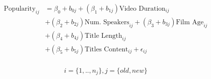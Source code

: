 \begin{align}
\begin{split}
\text{Popularity}_{ij}&=\beta_0+b_{0j}+(\beta_1+b_{1j})\text{Video Duration}_{ij}\\
&+(\beta_2+b_{2j})\text{Num. Speakers}_{ij}+(\beta_3+b_{3j})\text{Film Age}_{ij}\\
&+(\beta_4+b_{4j})\text{Title Length}_{ij}\\
&+(\beta_5+b_{5j})\text{Titles Content}_{ij}+\epsilon_{ij}\\
\end{split}
\label{linear_mixed_times_eqn}
\end{align}

\begin{equation*}
i=\{1,..,n_j\}, j=\{old, new\}
\end{equation*}